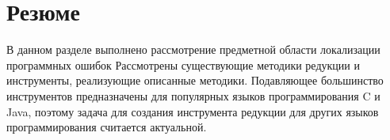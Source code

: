 \section{Резюме}
В данном разделе выполнено рассмотрение предметной области локализации программных ошибок Рассмотрены существу­ющие методики редукции и инструменты, реализующие описанные методики. Подавляющее большинство инструментов предназначены для популярных языков программирования C и Java, поэтому задача для создания инструмента редукции для других языков программирования считается актуальной.